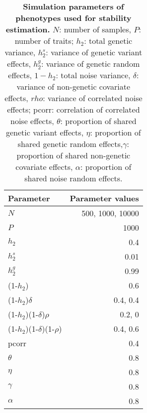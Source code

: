 \begin{table}[h]
  \centering
  \caption[\textbf{Simulation parameters of phenotypes used for stability estimation. }]{\textbf{Simulation parameters of phenotypes used for stability estimation. }\(N\): number of samples, \(P\): number of traits; \(h_2\): total genetic variance, \(h_2^s\): variance of genetic variant effects, \(h_2^g\): variance of genetic random effects, \(1 - h_2\): total noise variance, \(\delta\): variance of non-genetic covariate effects, \(rho\): variance of correlated noise effects; pcorr: correlation of correlated noise effects, \(\theta\): proportion of shared genetic variant effects, \(\eta\):  proportion of shared genetic random effects,\(\gamma\): proportion of shared non-genetic covariate effects, \(\alpha\): proportion of shared noise random effects.}
    \begin{tabular}{lr}
    \toprule
    Parameter & Parameter values \\
    \midrule
    \(N\) & \num{500}, \num{1000}, \num{10000} \\
    \(P\) & \num{1000} \\
    \addlinespace[1.5ex]
    \(h_2\) & 0.4 \\
    \(h_2^s\) & 0.01 \\
    \(h_2^g\) & 0.99 \\
   \addlinespace[1.5ex]
    (1-\(h_2\)) & 0.6 \\
    (1-\(h_2\))\(\delta\) & 0.4, 0.4 \\
    (1-\(h_2\))(1-\(\delta\))\(\rho\) & 0.2, 0 \\
    (1-\(h_2\))(1-\(\delta\))(1-\(\rho\)) & 0.4, 0.6 \\
   \addlinespace[1.5ex]
    pcorr & 0.4 \\
    \(\theta\) & 0.8 \\
    \(\eta\) & 0.8 \\
    \(\gamma\) & 0.8 \\
    \(\alpha\) & 0.8 \\
    \bottomrule
    \end{tabular}%
  \label{tab:parametersSimulationDimRed}%
\end{table}%


